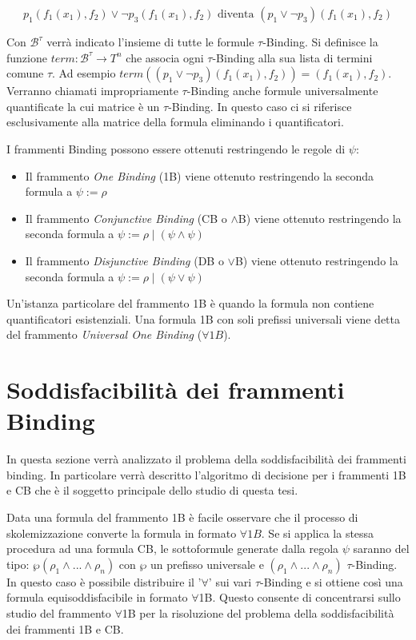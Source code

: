 \documentclass[./main.tex]{subfiles}
\begin{document}
$$p_1(f_1(x_1), f_2) \lor \lnot p_3(f_1(x_1), f_2) \text{ diventa } (p_1 \lor \lnot p_3)(f_1(x_1), f_2)$$

Con $\mathcal{B}^\tau$ verrà indicato l'insieme di tutte le formule $\tau$-Binding.
Si definisce la funzione $term: \mathcal{B}^\tau \rightarrow T^n$ 
che associa ogni $\tau$-Binding alla sua lista di termini comune $\tau$.
Ad esempio $term((p_1 \lor \lnot p_3)(f_1(x_1), f_2)) = (f_1(x_1), f_2)$.
Verranno chiamati impropriamente $\tau$-Binding anche formule universalmente quantificate la cui matrice è un $\tau$-Binding.
In questo caso ci si riferisce esclusivamente alla matrice della formula eliminando i quantificatori.


I frammenti Binding possono essere ottenuti restringendo le regole di $\psi$:

\begin{itemize}
    \item Il frammento \textit{One Binding} (1B) viene ottenuto restringendo la seconda formula 
    a $\psi := \rho$
    \item Il frammento \textit{Conjunctive Binding} (CB o $\land$B) viene ottenuto restringendo la seconda formula 
a $\psi := \rho \mid (\psi \land \psi)$
    \item Il frammento \textit{Disjunctive Binding} (DB o $\lor$B) viene ottenuto restringendo la seconda formula 
    a $\psi := \rho \mid (\psi \lor \psi)$
\end{itemize}

Un'istanza particolare del frammento 1B è quando la formula non contiene quantificatori esistenziali.
Una formula 1B con soli prefissi universali viene detta del frammento \textit{Universal One Binding} ($\forall 1B$).



\section{Soddisfacibilità dei frammenti Binding}
In questa sezione verrà analizzato il problema della soddisfacibilità dei frammenti binding.
In particolare verrà descritto l'algoritmo di decisione per i frammenti 1B e CB che è il soggetto principale dello studio di questa tesi.

Data una formula del frammento 1B è facile osservare che il processo di skolemizzazione
converte la formula in formato $\forall 1B$. 
Se si applica la stessa procedura ad una formula CB, le sottoformule generate dalla regola $\psi$ saranno del tipo:
$\wp (\rho_1 \land ... \land \rho_n)$ con $\wp$ un prefisso universale e $(\rho_1 \land ... \land \rho_n)$
$\tau$-Binding. In questo caso è possibile distribuire il '$\forall$' sui vari $\tau$-Binding e si ottiene così una formula 
equisoddisfacibile in formato $\forall$1B. Questo consente di concentrarsi sullo studio del frammento $\forall$1B
per la risoluzione del problema della soddisfacibilità dei frammenti 1B e CB. 
\end{document}
